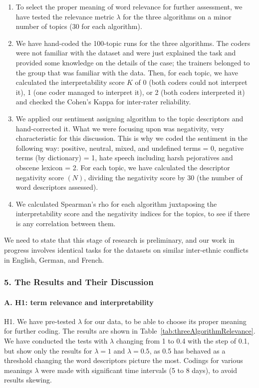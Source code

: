 \begin{enumerate}
	\item To select the proper meaning of word relevance for further assessment, we have tested the relevance metric \(\lambda\) for the three algorithms on a minor number of topics (30 for each algorithm).
	\item We have hand-coded the 100-topic runs for the three algorithms. The coders were not familiar with the dataset and were just explained the task and provided some knowledge on the details of the case; the trainers belonged to the group that was familiar with the data. Then, for each topic, we have calculated the interpretability score \(K\) of 0 (both coders could not interpret it), 1 (one coder managed to interpret it), or 2 (both coders interpreted it) and checked the Cohen’s Kappa for inter-rater reliability.
	\item We applied our sentiment assigning algorithm \cite{BlekanovKukarkinMaksimov} to the topic descriptors and hand-corrected it. What we were focusing upon was negativity, very characteristic for this discussion. This is why we coded the sentiment in the following way: positive, neutral, mixed, and undefined terms = 0, negative terms (by dictionary) = 1, hate speech including harsh pejoratives and obscene lexicon = 2. For each topic, we have calculated the descriptor negativity score \((N)\), dividing the negativity score by 30 (the number of word descriptors assessed).
	\item We calculated Spearman’s rho for each algorithm juxtaposing the interpretability score and the negativity indices for the topics, to see if there is any correlation between them.
\end{enumerate}

We need to state that this stage of research is preliminary, and our work in progress involves identical tasks for the datasets on similar inter-ethnic conflicts in English, German, and French.

\subsubsection{5. The Results and Their Discussion}

\paragraph{A. H1: term relevance and interpretability}
H1. We have pre-tested \(\lambda\) for our data, to be able to choose its proper meaning for further coding. The results are shown in Table~\cref{tab:threeAlgorithmRelevance}. We have conducted the tests with \(\lambda\) changing from 1 to 0.4 with the step of 0.1, but show only the results for \(\lambda = 1\) and \(\lambda = 0.5\), as 0.5 has behaved as a threshold changing the word descriptors picture the most. Codings for various meanings \(\lambda\) were made with significant time intervals (5 to 8 days), to avoid results skewing.

